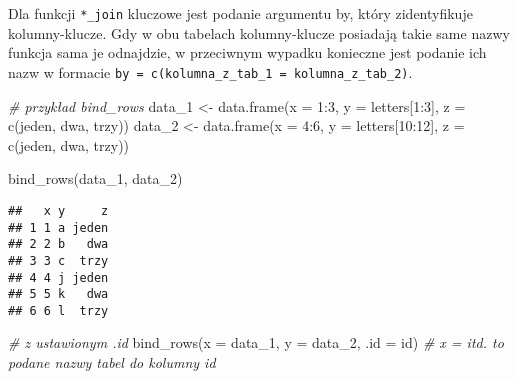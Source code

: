 \documentclass[
]{book}
\newenvironment{Shaded}{\begin{snugshade}}{\end{snugshade}}
\newcommand{\AttributeTok}[1]{\textcolor[rgb]{0.77,0.63,0.00}{#1}}
\newcommand{\CommentTok}[1]{\textcolor[rgb]{0.56,0.35,0.01}{\textit{#1}}}
\newcommand{\DecValTok}[1]{\textcolor[rgb]{0.00,0.00,0.81}{#1}}
\newcommand{\FunctionTok}[1]{\textcolor[rgb]{0.00,0.00,0.00}{#1}}
\newcommand{\NormalTok}[1]{#1}
\newcommand{\OtherTok}[1]{\textcolor[rgb]{0.56,0.35,0.01}{#1}}
\newcommand{\SpecialCharTok}[1]{\textcolor[rgb]{0.00,0.00,0.00}{#1}}
\newcommand{\StringTok}[1]{\textcolor[rgb]{0.31,0.60,0.02}{#1}}
\begin{document}
Dla funkcji \texttt{*\_join} kluczowe jest podanie argumentu by, który zidentyfikuje kolumny-klucze. Gdy w obu tabelach kolumny-klucze posiadają takie same nazwy funkcja sama je odnajdzie, w przeciwnym wypadku konieczne jest podanie ich nazw w formacie \texttt{by\ =\ c(\textquotesingle{}kolumna\_z\_tab\_1\textquotesingle{}\ =\ \textquotesingle{}kolumna\_z\_tab\_2\textquotesingle{})}.

\begin{Shaded}
\begin{Highlighting}[]
\CommentTok{\# przykład bind\_rows}
\NormalTok{data\_1 }\OtherTok{\textless{}{-}} \FunctionTok{data.frame}\NormalTok{(}\AttributeTok{x =} \DecValTok{1}\SpecialCharTok{:}\DecValTok{3}\NormalTok{, }\AttributeTok{y =}\NormalTok{ letters[}\DecValTok{1}\SpecialCharTok{:}\DecValTok{3}\NormalTok{], }\AttributeTok{z =} \FunctionTok{c}\NormalTok{(}\StringTok{\textquotesingle{}jeden\textquotesingle{}}\NormalTok{, }\StringTok{\textquotesingle{}dwa\textquotesingle{}}\NormalTok{, }\StringTok{\textquotesingle{}trzy\textquotesingle{}}\NormalTok{))}
\NormalTok{data\_2 }\OtherTok{\textless{}{-}} \FunctionTok{data.frame}\NormalTok{(}\AttributeTok{x =} \DecValTok{4}\SpecialCharTok{:}\DecValTok{6}\NormalTok{, }\AttributeTok{y =}\NormalTok{ letters[}\DecValTok{10}\SpecialCharTok{:}\DecValTok{12}\NormalTok{], }\AttributeTok{z =} \FunctionTok{c}\NormalTok{(}\StringTok{\textquotesingle{}jeden\textquotesingle{}}\NormalTok{, }\StringTok{\textquotesingle{}dwa\textquotesingle{}}\NormalTok{, }\StringTok{\textquotesingle{}trzy\textquotesingle{}}\NormalTok{))}

\FunctionTok{bind\_rows}\NormalTok{(data\_1, data\_2)}
\end{Highlighting}
\end{Shaded}

\begin{verbatim}
##   x y     z
## 1 1 a jeden
## 2 2 b   dwa
## 3 3 c  trzy
## 4 4 j jeden
## 5 5 k   dwa
## 6 6 l  trzy
\end{verbatim}

\begin{Shaded}
\begin{Highlighting}[]
\CommentTok{\# z ustawionym .id}
\FunctionTok{bind\_rows}\NormalTok{(}\AttributeTok{x =}\NormalTok{ data\_1, }\AttributeTok{y =}\NormalTok{ data\_2, }\AttributeTok{.id =} \StringTok{\textquotesingle{}id\textquotesingle{}}\NormalTok{) }\CommentTok{\# x =  itd. to podane nazwy tabel do kolumny id}
\end{Highlighting}
\end{Shaded}
\end{document}
